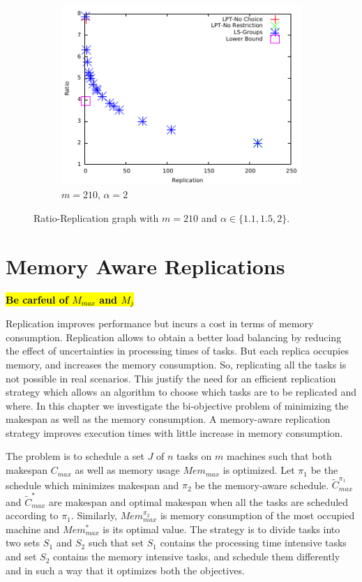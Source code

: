 \documentclass[twocolumn]{svjour3}
\newcommand{\todo}[1]{{\color{red}\textbf{\hl{#1}}\xspace}}
\begin{document}
\begin {figure}
  \begin{subfigure}[b]{0.5\textwidth}
    \includegraphics[width=\textwidth]{alpha_2.pdf}
    \caption{$m=210$, $\alpha=2$}
    \label{fig:3}
  \end{subfigure} %

  \caption{Ratio-Replication graph with $m=210$ and $\alpha \in \{1.1, 1.5, 2\}$.}
  \label{fig:Graph}
\end{figure}


\section{Memory Aware Replications}\label{ch5}
   
\todo{Be carfeul of $M_{max}$ and $M_j$}
   
Replication improves performance but incurs a cost in terms of memory
consumption.  Replication allows to obtain a better load balancing by
reducing the effect of uncertainties in processing times of tasks. But
each replica occupies memory, and increases the memory consumption.
So, replicating all the tasks is not possible in real scenarios. This
justify the need for an efficient replication strategy which allows an
algorithm to choose which tasks are to be replicated and where.  In
this chapter we investigate the bi-objective problem of minimizing the
makespan as well as the memory consumption. A memory-aware replication
strategy improves execution times with little increase in memory
consumption.
   
The problem is to schedule a set $J$ of $n$ tasks on $m$ machines such
that both makespan $C_{max}$ as well as memory usage $Mem_{max}$ is
optimized.  Let $\pi_1$ be the schedule which minimizes makespan and
$\pi_2$ be the memory-aware schedule. $\tilde{C}^{\pi_1}_{max}$ and
$\tilde{C}^{*}_{max}$ are makespan and optimal makespan when all the
tasks are scheduled according to $\pi_1$. Similarly, $Mem^{\pi_2}_{max}$
is memory consumption of the most occupied machine and $Mem^*_{max}$ is
its optimal value. The strategy is to divide tasks into two sets $S_1$
and $S_2$ such that set $S_1$ contains the processing time intensive
tasks and set $S_2$ contains the memory intensive tasks, and schedule
them differently and in such a way that it optimizes both the
objectives.
     
\end{document}
